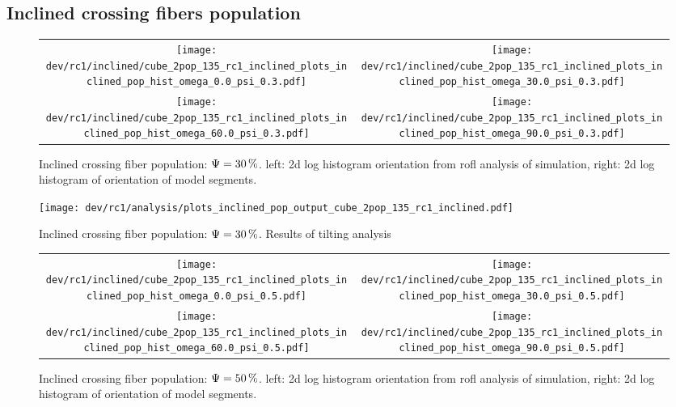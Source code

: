 \subsection{Inclined crossing fibers population}
\label{sec:resInclCross}
%
\begin{figure}[!t]
\centering
\setlength{\tikzwidth}{0.45\textwidth}
\begin{tabular}{c|c}
    \texttt{[image: dev/rc1/inclined/cube\_2pop\_135\_rc1\_inclined\_plots\_inclined\_pop\_hist\_omega\_0.0\_psi\_0.3.pdf]} &
    \texttt{[image: dev/rc1/inclined/cube\_2pop\_135\_rc1\_inclined\_plots\_inclined\_pop\_hist\_omega\_30.0\_psi\_0.3.pdf]} \\ \texttt{[image: dev/rc1/inclined/cube\_2pop\_135\_rc1\_inclined\_plots\_inclined\_pop\_hist\_omega\_60.0\_psi\_0.3.pdf]} & \texttt{[image: dev/rc1/inclined/cube\_2pop\_135\_rc1\_inclined\_plots\_inclined\_pop\_hist\_omega\_90.0\_psi\_0.3.pdf]}
\end{tabular}
%
\caption[sim]{Inclined crossing fiber population: $\textnormal{$\Psi$}=\SI{30}{\percent}$. left: 2d log histogram orientation from rofl analysis of simulation, right: 2d log histogram of orientation of model segments. }
\label{fig:inclined_03_fiber_pop_hist}
\end{figure}
%
\begin{figure}[!p]
\centering
\texttt{[image: dev/rc1/analysis/plots\_inclined\_pop\_output\_cube\_2pop\_135\_rc1\_inclined.pdf]}
\caption[]{Inclined crossing fiber population: $\textnormal{$\Psi$}=\SI{30}{\percent}$. Results of tilting analysis}
\label{fig:inclined_03_fiber_pop_rofl}
\end{figure}
%
\begin{figure}[!t]
\centering
\setlength{\tikzwidth}{0.45\textwidth}
\begin{tabular}{c|c}
    \texttt{[image: dev/rc1/inclined/cube\_2pop\_135\_rc1\_inclined\_plots\_inclined\_pop\_hist\_omega\_0.0\_psi\_0.5.pdf]} &
    \texttt{[image: dev/rc1/inclined/cube\_2pop\_135\_rc1\_inclined\_plots\_inclined\_pop\_hist\_omega\_30.0\_psi\_0.5.pdf]} \\
    \texttt{[image: dev/rc1/inclined/cube\_2pop\_135\_rc1\_inclined\_plots\_inclined\_pop\_hist\_omega\_60.0\_psi\_0.5.pdf]} &
    \texttt{[image: dev/rc1/inclined/cube\_2pop\_135\_rc1\_inclined\_plots\_inclined\_pop\_hist\_omega\_90.0\_psi\_0.5.pdf]}
\end{tabular}
\caption[sim]{Inclined crossing fiber population: $\textnormal{$\Psi$}=\SI{50}{\percent}$. left: 2d log histogram orientation from rofl analysis of simulation, right: 2d log histogram of orientation of model segments. }
\label{fig:inclined_05_fiber_pop_hist}
\end{figure}
